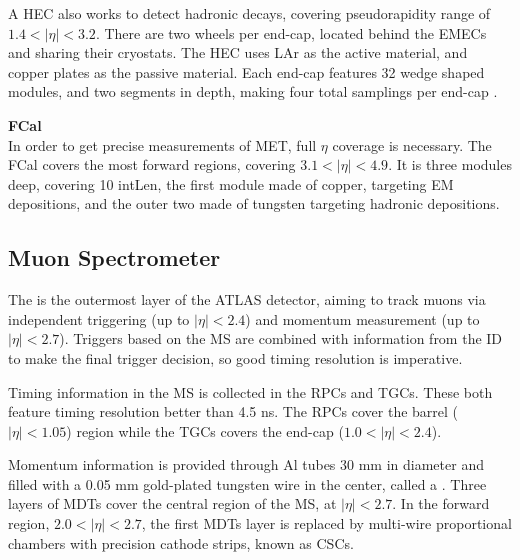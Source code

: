 A \gls{HEC} also works to detect hadronic decays, covering pseudorapidity range of $1.4 < |\eta| < 3.2$. There are two wheels per end-cap, located behind the \glspl{EMEC} and sharing their cryostats. The \gls{HEC} uses \gls{LAr} as the active material, and copper plates as the passive material. Each end-cap features 32 wedge shaped modules, and two segments in depth, making four total samplings per end-cap \cite{lar-tdr}.


\noindent\textbf{\gls{FCal}}\\
\indent In order to get precise measurements of \gls{MET}, full $\eta$ coverage is necessary. The \gls{FCal} covers the most forward regions, covering $3.1 < |\eta| < 4.9$. It is three modules deep, covering 10 \gls{intLen}, the first module made of copper, targeting \gls{EM} depositions, and the outer two made of tungsten targeting hadronic depositions.


\subsection{Muon Spectrometer} \label{ssec:muonspectrometer}
The  \cite{muon-tdr} is the outermost layer of the ATLAS detector, aiming to track muons via independent triggering (up to $|\eta| < 2.4$) and momentum measurement (up to $|\eta| < 2.7$). Triggers based on the \gls{MS} are combined with information from the \gls{ID} to make the final trigger decision, so good timing resolution is imperative.

Timing information in the \gls{MS} is collected in the \glspl{RPC} and \glspl{TGC}. These both feature timing resolution better than 4.5 ns. The \glspl{RPC} cover the barrel ($|\eta| < 1.05$) region while the \glspl{TGC} covers the end-cap ($1.0<|\eta|<2.4$).


Momentum information is provided through Al tubes 30 mm in diameter and filled with a 0.05 mm gold-plated tungsten wire in the center, called a . Three layers of \glspl{MDT} cover the central region of the \gls{MS}, at $|\eta| < 2.7$. In the forward region, $2.0<|\eta|<2.7$, the first \glspl{MDT} layer is replaced by multi-wire proportional chambers with precision cathode strips, known as \glspl{CSC}.

